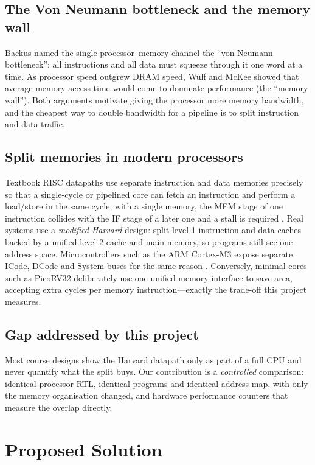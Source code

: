 \documentclass[conference]{IEEEtran}
\begin{document}
\subsection{The Von Neumann bottleneck and the memory wall}
Backus \cite{backus1978} named the single processor--memory channel the
``von Neumann bottleneck'': all instructions and all data must squeeze
through it one word at a time. As processor speed outgrew DRAM speed, Wulf
and McKee \cite{wulf1995} showed that average memory access time would come
to dominate performance (the ``memory wall''). Both arguments motivate
giving the processor more memory bandwidth, and the cheapest way to double
bandwidth for a pipeline is to split instruction and data traffic.

\subsection{Split memories in modern processors}
Textbook RISC datapaths \cite{patterson2020,harris2021} use separate
instruction and data memories precisely so that a single-cycle or pipelined
core can fetch an instruction and perform a load/store in the same cycle;
with a single memory, the MEM stage of one instruction collides with the IF
stage of a later one and a stall is required \cite{hennessy2017}. Real
systems use a \emph{modified Harvard} design: split level-1 instruction and
data caches \cite{smith1982} backed by a unified level-2 cache and main
memory, so programs still see one address space. Microcontrollers such as the
ARM Cortex-M3 expose separate ICode, DCode and System buses for the same
reason \cite{arm_m3}. Conversely, minimal cores such as PicoRV32
\cite{picorv32} deliberately use one unified memory interface to save area,
accepting extra cycles per memory instruction---exactly the trade-off this
project measures.

\subsection{Gap addressed by this project}
Most course designs show the Harvard datapath only as part of a full CPU and
never quantify what the split buys. Our contribution is a \emph{controlled}
comparison: identical processor RTL, identical programs and identical address
map, with only the memory organisation changed, and hardware performance
counters that measure the overlap directly.

\section{Proposed Solution}
\end{document}
